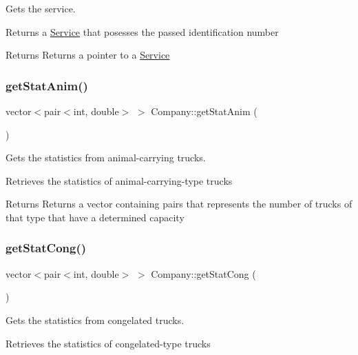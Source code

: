 Gets the service. 

Returns a \hyperlink{class_service}{Service} that posesses the passed identification number

\begin{DoxyReturn}{Returns}
Returns a pointer to a \hyperlink{class_service}{Service} 
\end{DoxyReturn}
\mbox{\label{class_company_af7e04162aac8a1057d2563e211e67460}} 
\subsubsection{\texorpdfstring{get\+Stat\+Anim()}{getStatAnim()}}
{\footnotesize\ttfamily vector$<$pair$<$int, double$>$ $>$ Company\+::get\+Stat\+Anim (\begin{DoxyParamCaption}{ }\end{DoxyParamCaption})\hspace{0.3cm}{\ttfamily [inline]}}



Gets the statistics from animal-\/carrying trucks. 

Retrieves the statistics of animal-\/carrying-\/type trucks

\begin{DoxyReturn}{Returns}
Returns a vector containing pairs that represents the number of trucks of that type that have a determined capacity 
\end{DoxyReturn}
\mbox{\label{class_company_a46ae11a39256db9dbf2941c58df579c5}} 
\subsubsection{\texorpdfstring{get\+Stat\+Cong()}{getStatCong()}}
{\footnotesize\ttfamily vector$<$pair$<$int, double$>$ $>$ Company\+::get\+Stat\+Cong (\begin{DoxyParamCaption}{ }\end{DoxyParamCaption})\hspace{0.3cm}{\ttfamily [inline]}}



Gets the statistics from congelated trucks. 

Retrieves the statistics of congelated-\/type trucks

